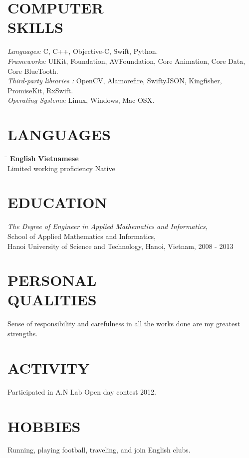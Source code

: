 \documentclass[margin, 10pt]{res}
\begin{document}
\begin{resume}
\section{COMPUTER \\ SKILLS}
   {\sl Languages:} C, C++, Objective-C, Swift, Python.\\
   {\sl Frameworks:} UIKit, Foundation, AVFoundation, Core Animation, Core Data, Core BlueTooth.\\
   {\sl Third-party libraries :} OpenCV, Alamorefire, SwiftyJSON, Kingfisher, PromiseKit, RxSwift.\\
   {\sl Operating Systems:} Linux, Windows, Mac OSX.

\section{LANGUAGES}
	\vspace{-0.1in}
	\begin{tabbing}
    \hspace{2.8in}\= \kill %
    \textbf{English}            \> \textbf{Vietnamese}\\
    Limited working proficiency \> Native\\
	\end{tabbing}\vspace{-20pt}
	
\section{EDUCATION}
   {\sl The Degree of Engineer in Applied Mathematics and Informatics,}\\
   School of Applied Mathematics and Informatics, \\
   Hanoi University of Science and Technology, Hanoi, Vietnam, 2008 - 2013 \\
	
\section{PERSONAL \\ QUALITIES} Sense of responsibility and carefulness in all the works done are my greatest strengths.\\
 
\section{ACTIVITY} Participated in A.N Lab Open day contest 2012.

\section{HOBBIES} Running, playing football, traveling, and join English clubs.

\end{resume}
\end{document}
